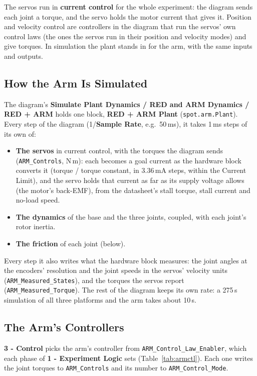 \documentclass[11pt,a4paper]{article}
\newcommand{\ui}[1]{\textsf{\textbf{#1}}}
\newcommand{\fn}[1]{\texttt{#1}}
\begin{document}
The servos run in \textbf{current control} for the whole experiment: the diagram sends each joint a torque, and the
servo holds the motor current that gives it. Position and velocity control are controllers in the diagram that run the
servos' own control laws (the ones the servos run in their position and velocity modes) and give torques. In
simulation the plant stands in for the arm, with the same inputs and outputs.

\subsection{How the Arm Is Simulated}
The diagram's \ui{Simulate Plant Dynamics / RED and ARM Dynamics / RED + ARM} holds one block, \ui{RED + ARM Plant}
(\fn{spot.arm.Plant}). Every step of the diagram (1/\ui{Sample Rate}, e.g.\ 50\,ms), it takes 1\,ms steps of its own of:
\begin{itemize}
  \item \textbf{The servos} in current control, with the torques the diagram sends (\fn{ARM\_Controls}, N\,m): each
        becomes a goal current as the hardware block converts it (torque / torque constant, in 3.36\,mA steps, within
        the Current Limit), and the servo holds that current as far as its supply voltage allows (the motor's
        back-EMF), from the datasheet's stall torque, stall current and no-load speed.
  \item \textbf{The dynamics} of the base and the three joints, coupled, with each joint's rotor inertia.
  \item \textbf{The friction} of each joint (below).
\end{itemize}
Every step it also writes what the hardware block measures: the joint angles at the encoders' resolution and the joint
speeds in the servos' velocity units (\fn{ARM\_Measured\_States}), and the torques the servos report
(\fn{ARM\_Measured\_Torque}). The rest of the diagram keeps its own rate: a 275\,s simulation of all three platforms
and the arm takes about 10\,s.

\subsection{The Arm's Controllers}
\ui{3 - Control} picks the arm's controller from \fn{ARM\_Control\_Law\_Enabler}, which each phase of
\ui{1 - Experiment Logic} sets (Table~\ref{tab:armctl}). Each one writes the joint torques to \fn{ARM\_Controls} and
its number to \fn{ARM\_Control\_Mode}.
\end{document}
